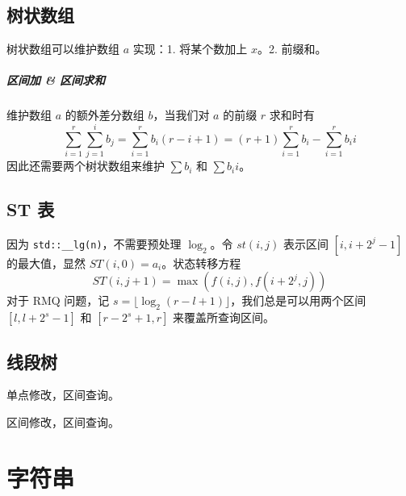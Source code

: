 \documentclass{probook}
\begin{document}
\begin{multicols}{2}
\section{树状数组}

树状数组可以维护数组 $a$ 实现：1. 将某个数加上 $x$。2. 前缀和。



\paragraph{区间加 \& 区间求和}

维护数组 $a$ 的额外差分数组 $b$，当我们对 $a$ 的前缀 $r$ 求和时有
\[ \sum_{i=1}^r \sum_{j=1}^i b_j = \sum_{i=1}^rb_i(r-i+1) = (r+1)\sum_{i=1}^rb_i - \sum_{i=1}^rb_ii \]
因此还需要两个树状数组来维护 $\sum b_i$ 和 $\sum b_ii$。



\section{ST 表}

因为 \lstinline{std::__lg(n)}，不需要预处理 $\log_2$。令 $st(i,j)$ 表示区间 $[i,i+2^j-1]$ 的最大值，显然 $ST(i,0)=a_i$。状态转移方程
\[ ST(i,j+1) = \max(f(i,j) , f(i+2^{j},j)) \]
对于 RMQ 问题，记 $s = \lfloor\log_2(r-l+1)\rfloor$，我们总是可以用两个区间 $[l,l+2^s-1]$ 和 $[r-2^s+1,r]$ 来覆盖所查询区间。



\section{线段树}

单点修改，区间查询。



区间修改，区间查询。









\chapter{字符串}


\end{multicols}
\end{document}
